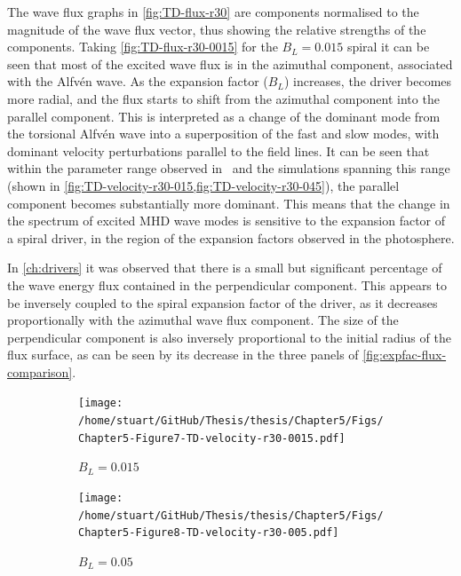 \documentclass[a4paper,12pt,fourier,authoryear,custommargin]{Classes/PhDThesisPSnPDF}
\begin{document}
The wave flux graphs in \cref{fig:TD-flux-r30} are components normalised to the magnitude of the wave flux vector, thus showing the relative strengths of the components.
Taking \cref{fig:TD-flux-r30-0015} for the $B_L=0.015$ spiral it can be seen that most of the excited wave flux is in the azimuthal component, associated with the Alfv\'en wave.
As the expansion factor ($B_L$) increases, the driver becomes more radial, and the flux starts to shift from the azimuthal component into the parallel component.
This is interpreted as a change of the dominant mode from the torsional Alfv\'en wave into a superposition of the fast and slow modes, with dominant velocity perturbations parallel to the field lines.
It can be seen that within the parameter range observed in~\cite{bonet2008} and the simulations spanning this range (shown in \cref{fig:TD-velocity-r30-015,fig:TD-velocity-r30-045}), the parallel component becomes substantially more dominant.
This means that the change in the spectrum of excited MHD wave modes is sensitive to the expansion factor of a spiral driver, in the region of the expansion factors observed in the photosphere.

In \cref{ch:drivers} it was observed that there is a small but significant percentage of the wave energy flux contained in the perpendicular component.
This appears to be inversely coupled to the spiral expansion factor of the driver, as it decreases proportionally with the azimuthal wave flux component.
The size of the perpendicular component is also inversely proportional to the initial radius of the flux surface, as can be seen by its decrease in the three panels of \cref{fig:expfac-flux-comparison}.



\begin{figure}
    \centering
    

    \begin{subfigure}[b]{0.9\columnwidth}
        \texttt{[image: /home/stuart/GitHub/Thesis/thesis/Chapter5/Figs/Chapter5-Figure7-TD-velocity-r30-0015.pdf]}
        \caption{$B_L = 0.015$}
        \label{fig:TD-velocity-r30-0015}
    \end{subfigure}

    \begin{subfigure}[b]{0.9\columnwidth}
        \texttt{[image: /home/stuart/GitHub/Thesis/thesis/Chapter5/Figs/Chapter5-Figure8-TD-velocity-r30-005.pdf]}
        \caption{$B_L = 0.05$}
        \label{fig:TD-velocity-r30-005}
    \end{subfigure}
    \caption{}
    \label{fig:}
\end{figure}
\end{document}
